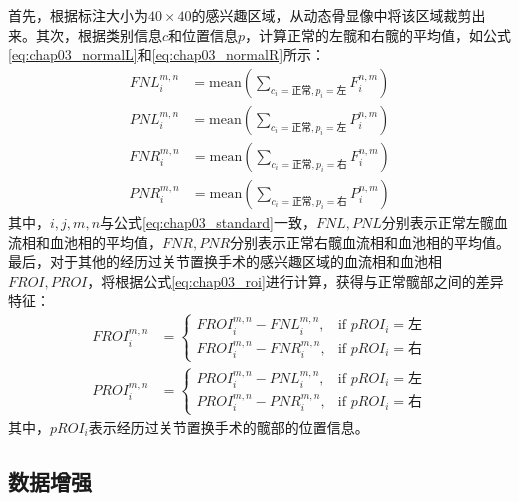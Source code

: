 首先，根据标注大小为\(40 \times 40\)的感兴趣区域，从动态骨显像中将该区域裁剪出来。其次，根据类别信息\(c\)和位置信息\(p\)，计算正常的左髋和右髋的平均值，如公式\ref{eq:chap03_normalL}和\ref{eq:chap03_normalR}所示：
\begin{equation}
  \begin{aligned}
    FNL_{i}^{m, n} & = \text{mean}(\sum_{c_i = \text{正常}, p_i = \text{左} } F_i^{n, m}) \\
    PNL_{i}^{m, n} & = \text{mean}(\sum_{c_i = \text{正常}, p_i = \text{左} } P_i^{n, m})
  \end{aligned}
  \label{eq:chap03_normalL}
\end{equation}
\begin{equation}
  \begin{aligned}
    FNR_{i}^{m, n} & = \text{mean}(\sum_{c_i = \text{正常}, p_i = \text{右} } F_i^{n, m}) \\
    PNR_{i}^{m, n} & = \text{mean}(\sum_{c_i = \text{正常}, p_i = \text{右} } P_i^{n, m})
  \end{aligned}
  \label{eq:chap03_normalR}
\end{equation}
其中，\(i, j, m, n\)与公式\ref{eq:chap03_standard}一致，\(FNL, PNL\)分别表示正常左髋血流相和血池相的平均值，\(FNR, PNR\)分别表示正常右髋血流相和血池相的平均值。最后，对于其他的经历过关节置换手术的感兴趣区域的血流相和血池相\(FROI, PROI\)，将根据公式\ref{eq:chap03_roi}进行计算，获得与正常髋部之间的差异特征：
\begin{equation}
  \begin{aligned}
    FROI_i^{m, n} & =
    \begin{cases}
      FROI_i^{m, n} - FNL_i^{m, n}, & \text{if \(pROI_i = \)左} \\
      FROI_i^{m, n} - FNR_i^{m, n}, & \text{if \(pROI_i = \)右}
    \end{cases} \\
    PROI_i^{m, n} & =
    \begin{cases}
      PROI_i^{m, n} - PNL_i^{m, n}, & \text{if \(pROI_i = \)左} \\
      PROI_i^{m, n} - PNR_i^{m, n}, & \text{if \(pROI_i = \)右}
    \end{cases}
  \end{aligned}
  \label{eq:chap03_roi}
\end{equation}
其中，\(pROI_i\)表示经历过关节置换手术的髋部的位置信息。

\subsection{数据增强}


